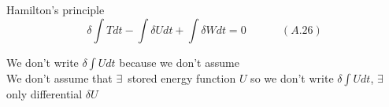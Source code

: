 \begin{appendix}
Hamilton's principle
\begin{equation}
\delta \int T dt - \int \delta U dt + \int \delta W dt = 0 \quad \quad \quad \, (A.26)
\end{equation}

We don't write $\delta \int U dt $ because we don't assume \\

We don't assume that $\exists \, $ stored energy function $U$ so we don't write $\delta \int U dt$, $\exists \, $ only differential $\delta U$

\end{appendix}
